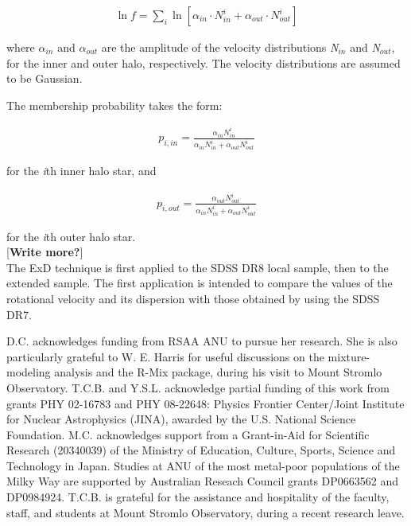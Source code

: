 \documentclass[apj]{emulateapj}
\begin{document}
\begin{eqnarray}
\ln f = \displaystyle\sum_{i} \ln [\alpha_{in}\cdot N^{i}_{in} + \alpha_{out}\cdot N^{i}_{out}]
\end{eqnarray}

where $\alpha_{in}$ and $\alpha_{out}$ are the amplitude of the velocity distributions \emph{N$_{in}$} and \emph{N$_{out}$}, for the inner and outer halo, respectively. The velocity distributions are assumed to be Gaussian.

The membership probability takes the form:

\begin{eqnarray}
p_{i, in} = \frac{\alpha_{in}N_{in}^{i}}{\alpha_{in}N_{in}^{i} + \alpha_{out}N_{out}^{i}}
\end{eqnarray}

for the \emph{i}th inner halo star, and

\begin{eqnarray}
p_{i, out} = \frac{\alpha_{out}N_{out}^{i}}{\alpha_{in}N_{in}^{i} + \alpha_{out}N_{out}^{i}}
\end{eqnarray}

for the \emph{i}th outer halo star.\\

[\textbf{Write more?}]\\

The ExD technique is first applied to the SDSS DR8 local sample, then to the extended sample. The first application is intended to compare the values of the rotational velocity and its dispersion with those obtained by using the SDSS DR7.






\acknowledgments
D.C. acknowledges funding from RSAA ANU to pursue her research. She is also
particularly grateful to W. E. Harris for useful discussions on the
mixture-modeling analysis and the R-Mix package, during his visit to Mount Stromlo
Observatory. T.C.B. and Y.S.L. acknowledge partial funding of this work from
grants PHY 02-16783 and PHY 08-22648: Physics Frontier Center/Joint Institute
for Nuclear Astrophysics (JINA), awarded by the U.S. National Science
Foundation. M.C. acknowledges support from a Grant-in-Aid for Scientific
Research (20340039) of the Ministry of Education, Culture, Sports, Science and
Technology in Japan. Studies at ANU of the most metal-poor populations of the
Milky Way are supported by Australian Reseach Council grants DP0663562 and
DP0984924. T.C.B. is grateful for the assistance and hospitality of the faculty,
staff, and students at Mount Stromlo Observatory, during a recent research leave.
\end{document}
